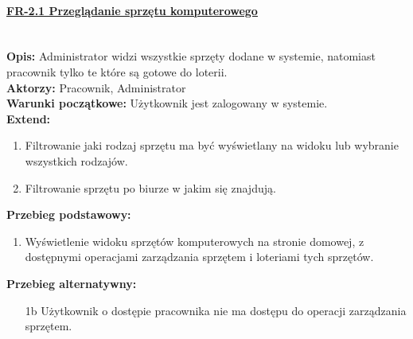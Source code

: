\paragraph{\underline{FR-2.1 Przeglądanie sprzętu komputerowego}}\mbox{}\\[1mm]
	\noindent\textbf{Opis:} Administrator widzi wszystkie sprzęty dodane w systemie, natomiast pracownik tylko te które są gotowe do loterii.\\
	\noindent\textbf{Aktorzy:} Pracownik, Administrator\\
	\textbf{Warunki początkowe:} Użytkownik jest zalogowany w systemie.\\
	\textbf{Extend:} 
	\begin{enumerate}[noparskip]
		\item Filtrowanie jaki rodzaj sprzętu ma być wyświetlany na widoku lub wybranie wszystkich rodzajów.
		\item Filtrowanie sprzętu po biurze w jakim się znajdują.
	\end{enumerate}
	\textbf{Przebieg podstawowy:}
	\begin{enumerate}[noparskip]
		\item Wyświetlenie widoku sprzętów komputerowych na stronie domowej, z dostępnymi operacjami zarządzania sprzętem i loteriami tych sprzętów.
	\end{enumerate} 
	\textbf{Przebieg alternatywny:}
	\begin{enumerate}[noparskip]
		\item[1b] Użytkownik o dostępie pracownika nie ma dostępu do operacji zarządzania sprzętem.
	\end{enumerate} \mbox{}\\[-11mm]

